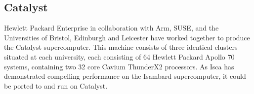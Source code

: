 \documentclass[a4paper,11pt]{report}
\begin{document}
\subsection{Catalyst}
Hewlett Packard Enterprise in collaboration with Arm, SUSE, and the Universities of Bristol, Edinburgh and Leicester have worked together to produce the Catalyst supercomputer. This machine consists of three identical clusters situated at each university, each consisting of 64 Hewlett Packard Apollo 70 systems, containing two 32 core Cavium ThunderX2 processors. As Isca has demonstrated compelling performance on the Isambard supercomputer, it could be ported to and run on Catalyst. 








\end{document}
